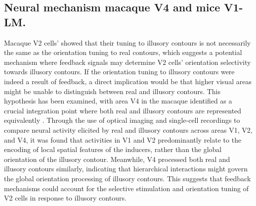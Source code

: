 \documentclass[12pt]{article}
\begin{document}
\bigbreak
\subsection{Neural mechanism macaque V4 and mice V1-LM.}
Macaque V2 cells' showed that their tuning to illusory contours is not necessarily the same as the orientation tuning to real contours, which suggests a potential mechanism where feedback signals may determine V2 cells' orientation selectivity towards illusory contours. If the orientation tuning to illusory contours were indeed a result of feedback, a direct implication would be that higher visual areas might be unable to distinguish between real and illusory contours. This hypothesis has been examined, with area V4 in the macaque identified as a crucial integration point where both real and illusory contours are represented equivalently \autocite{panEquivalentRepresentationReal2012}. Through the use of optical imaging and single-cell recordings to compare neural activity elicited by real and illusory contours across areas V1, V2, and V4, it was found that activities in V1 and V2 predominantly relate to the encoding of local spatial features of the inducers, rather than the global orientation of the illusory contour. Meanwhile, V4 processed both real and illusory contours similarly, indicating that hierarchical interactions might govern the global orientation processing of illusory contours. This suggests that feedback mechanisms could account for the selective stimulation and orientation tuning of V2 cells in response to illusory contours.
\bigbreak
\end{document}

